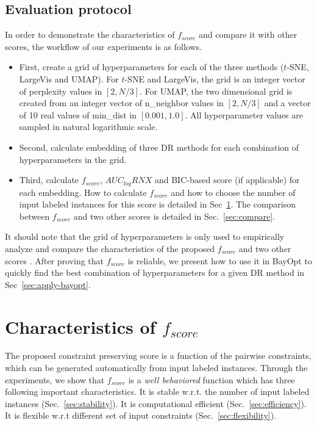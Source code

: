 \subsection{Evaluation protocol}\label{sec:xp:protocol}
In order to demonstrate the characteristics of $f_{score}$ and compare it with other scores, the workflow of our experiments is as follows.
\begin{itemize}
\item First, create a grid of hyperparameters for each of the three methods ($t$-SNE, LargeVis and UMAP).
  For $t$-SNE and LargeVis, the grid is an integer vector of perplexity values in $[2,N/3]$.
  For UMAP, the two dimensional grid is created from an integer vector of {n\_neighbor} values in $[2,N/3]$ and a vector of 10 real values of {min\_dist} in $[0.001, 1.0]$.
  All hyperparameter values are sampled in natural logarithmic scale.
\item Second, calculate embedding of three DR methods for each combination of hyperparameters in the grid.
\item Third, calculate $f_{score}$, $AUC_{log}RNX$ and BIC-based score (if applicable) for each embedding.
  How to calculate $f_{score}$ and how to choose the number of input labeled instances for this score is detailed in Sec~\ref{sec:characteristics}.
  The comparison between $f_{score}$ and two other scores is detailed in Sec.~\ref{sec:compare}.
\end{itemize}

It should note that the grid of hyperparameters is only used to empirically analyze and compare the characteristics of the proposed $f_{score}$ and two other scores .
After proving that $f_{score}$ is reliable, we present how to use it in BayOpt to quickly find the best combination of hyperparameters for a given DR method in Sec~\ref{sec:apply-bayopt}.

\section{Characteristics of $f_{score}$}\label{sec:characteristics}

The proposed constraint preserving score is a function of the pairwise constraints, which can be generated automatically from input labeled instances.
Through the experiments, we show that $f_{score}$ is a \emph{well behaviored}  function which has three following important characteristics.
It is stable w.r.t. the number of input labeled instances (Sec.~\ref{sec:stability}).
It is computational efficient (Sec.~\ref{sec:efficiency}).
It is flexible w.r.t different set of input constraints (Sec.~\ref{sec:flexibility}).


